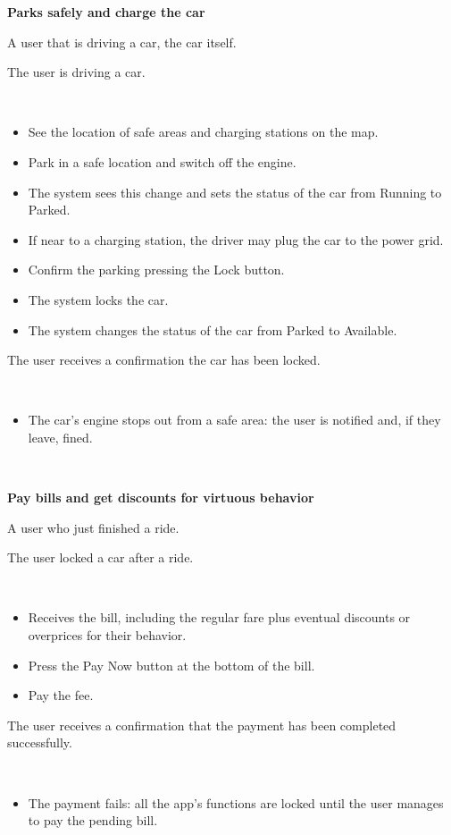 \documentclass[11pt]{article} %
\begin{document}
\begin{description}[noitemsep,topsep=0pt,parsep=0pt,partopsep=0pt]
	\item[Name:] \textbf{Parks safely and charge the car}
	\item[Actors Involved:]  A user that is driving a car, the car itself.
	\item[Entry Conditions:] The user is driving a car.
	\item[Flow Of Events:] \hfill\
	\begin{itemize}
		\item See the location of safe areas and charging stations on the map.
		\item Park in a safe location and switch off the engine.
		\item The system sees this change and sets the status of the car from Running to Parked.
		\item If near to a charging station, the driver may plug the car to the power grid.
		\item Confirm the parking pressing the Lock button.
		\item The system locks the car.
		\item The system changes the status of the car from Parked to Available.
	\end{itemize}
	\item[Exit conditions:]  The user receives a confirmation the car has been locked.
	\item[Exceptions:] \hfill\
	\begin{itemize}
		\item The car's engine stops out from a safe area: the user is notified and, if they leave, fined.
	\end{itemize}
\end{description}
\hfill\

\begin{description}[noitemsep,topsep=0pt,parsep=0pt,partopsep=0pt]
	\item[Name:] \textbf{Pay bills and get discounts for virtuous behavior}
	\item[Actors Involved:] A user who just finished a ride.
	\item[Entry Conditions:] The user locked a car after a ride.
	\item[Flow Of Events:] \hfill\
	\begin{itemize}
		\item Receives the bill, including the regular fare plus eventual discounts or overprices for their behavior.
		\item Press the Pay Now button at the bottom of the bill.
		\item Pay the fee.
	\end{itemize}
	\item[Exit conditions:]  The user receives a confirmation that the payment has been completed successfully.
	\item[Exceptions:] \hfill\
	\begin{itemize}
		\item The payment fails: all the app's functions are locked until the user manages to pay the pending bill.
	\end{itemize}
\end{description}
\hfill\
\end{document}
